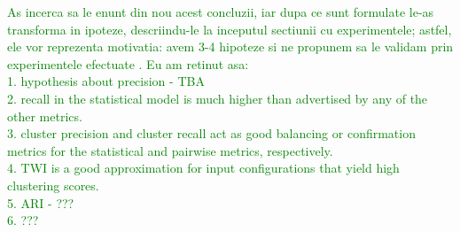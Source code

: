 \textcolor{green}{As incerca sa le enunt din nou acest concluzii, iar dupa ce sunt formulate le-as transforma in ipoteze, descriindu-le la inceputul sectiunii cu experimentele; astfel, ele vor reprezenta motivatia: avem 3-4 hipoteze si ne propunem sa le validam prin experimentele efectuate . Eu am retinut asa: \\
1. hypothesis about precision - TBA \\
2. recall in the statistical model is much higher than advertised by any of the other metrics.\\
3. cluster precision and cluster recall act as good balancing or
confirmation metrics for the statistical and pairwise metrics, respectively.\\
4. TWI is a good approximation for input configurations that yield high clustering scores.\\
5. ARI - ???\\
6. ???
}

